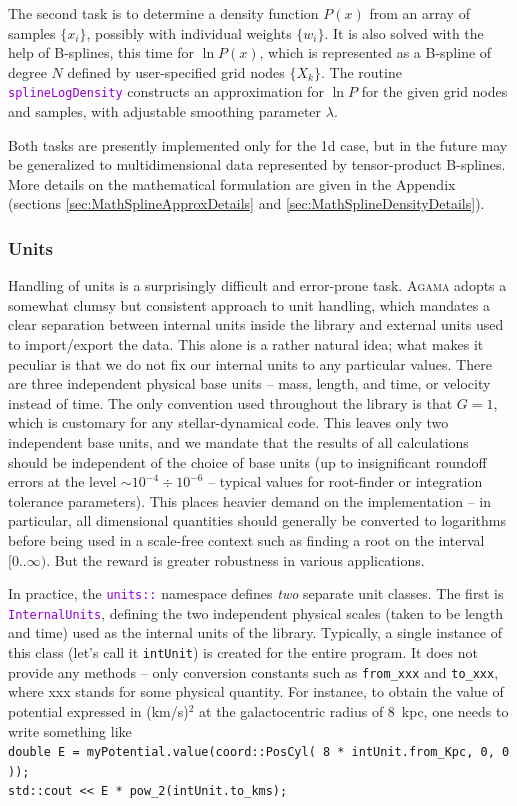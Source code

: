\documentclass[12pt]{article}
\newcommand{\Agama}{\textsc{Agama}\xspace}
\newcommand{\ttt}[1]{\textcolor{darkviolet}{\texttt{#1}}}
\begin{document}
The second task is to determine a density function $P(x)$ from an array of samples $\{x_i\}$, possibly with individual weights $\{w_i\}$. It is also solved with the help of B-splines, this time for $\ln P(x)$, which is represented as a B-spline of degree $N$ defined by user-specified grid nodes $\{X_k\}$. The routine \ttt{splineLogDensity} constructs an approximation for $\ln P$ for the given grid nodes and samples, with adjustable smoothing parameter $\lambda$.

Both tasks are presently implemented only for the 1d case, but in the future may be generalized to multidimensional data represented by tensor-product B-splines. More details on the mathematical formulation are given in the Appendix (sections \ref{sec:MathSplineApproxDetails} and \ref{sec:MathSplineDensityDetails}).


\subsubsection{Units}  \label{sec:Units}

Handling of units is a surprisingly difficult and error-prone task. \Agama adopts a somewhat clumsy but consistent approach to unit handling, which mandates a clear separation between internal units inside the library and external units used to import/export the data. This alone is a rather natural idea; what makes it peculiar is that we do not fix our internal units to any particular values. There are three independent physical base units -- mass, length, and time, or velocity instead of time. The only convention used throughout the library is that $G=1$, which is customary for any stellar-dynamical code. This leaves only two independent base units, and we mandate that the results of all calculations should be independent of the choice of base units (up to insignificant roundoff errors at the level $\sim 10^{-4}\div 10^{-6}$ -- typical values for root-finder or integration tolerance parameters). This places heavier demand on the implementation -- in particular, all dimensional quantities should generally be converted to logarithms before being used in a scale-free context such as finding a root on the interval $[0..\infty)$. But the reward is greater robustness in various applications.

In practice, the \ttt{units::} namespace defines \textit{two} separate unit classes. The first is \ttt{InternalUnits}, defining the two independent physical scales (taken to be length and time) used as the internal units of the library. Typically, a single instance of this class (let's call it \texttt{intUnit}) is created for the entire program. It does not provide any methods -- only conversion constants such as \texttt{from_xxx} and \texttt{to_xxx}, where xxx stands for some physical quantity. For instance, to obtain the value of potential expressed in (km/s)${}^2$ at the galactocentric radius of 8~kpc, one needs to write something like \\
\texttt{double E = myPotential.value(coord::PosCyl( 8 * intUnit.from_Kpc, 0, 0 ));}\\
\texttt{std::cout << E * pow_2(intUnit.to_kms);}
\end{document}
